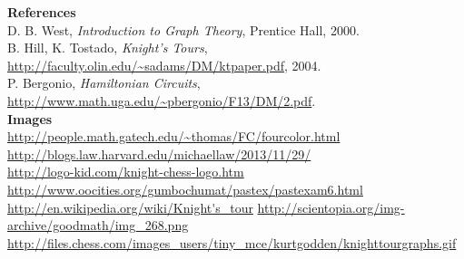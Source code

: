 \documentclass{beamer}
\begin{document}
\begin{frame}
\textbf{References} \\
D. B. West, \textit{Introduction to Graph Theory}, Prentice Hall, 2000. \\
\vspace{2mm}
B. Hill, K. Tostado, \textit{Knight's Tours}, \url{http://faculty.olin.edu/~sadams/DM/ktpaper.pdf}, 2004. \\
\vspace{2mm}
P. Bergonio, \textit{Hamiltonian Circuits}, \url{http://www.math.uga.edu/~pbergonio/F13/DM/2.pdf}. \\
\vspace{5mm}
\footnotesize
\textbf{Images} \\
\url{http://people.math.gatech.edu/~thomas/FC/fourcolor.html} \\
\url{http://blogs.law.harvard.edu/michaellaw/2013/11/29/} \\
\url{http://logo-kid.com/knight-chess-logo.htm} \\
\url{http://www.oocities.org/gumbochumat/pastex/pastexam6.html}
\url{http://en.wikipedia.org/wiki/Knight's_tour}
\url{http://scientopia.org/img-archive/goodmath/img_268.png}
\url{http://files.chess.com/images_users/tiny_mce/kurtgodden/knighttourgraphs.gif}
\end{frame}
\end{document}
